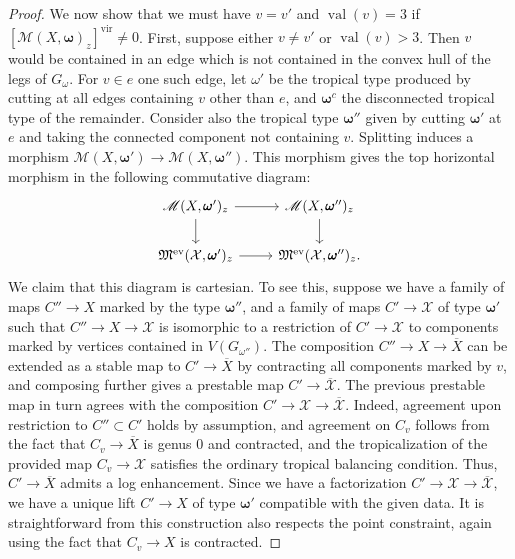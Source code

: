 \documentclass[12pt, oneside]{amsart}   	%
\newcommand{\val}{\operatorname{val}}
\newcommand{\vir}{\operatorname{vir}}
\newcommand{\ev}{\operatorname{ev}}
\numberwithin{equation}{section}
\numberwithin{thm}{section}
\numberwithin{figure}{section}
\begin{document}
\begin{proof}
We now show that we must have $v = v'$ and $\val(v) = 3$ if $[\mathscr{M}(X,\pmb\omega)_z]^{\vir} \not= 0$. First, suppose either $v \not= v'$ or $\val(v) > 3$. Then $v$ would be contained in an edge which is not contained in the convex hull of the legs of $G_\omega$. For $v \in e$ one such edge, let $\omega'$ be the tropical type produced by cutting at all edges containing $v$ other than $e$, and $\pmb\omega^c$ the disconnected tropical type of the remainder. Consider also the tropical type $\pmb\omega''$ given by cutting $\pmb\omega'$ at $e$ and taking the connected component not containing $v$. Splitting induces a morphism $\mathscr{M}(X,\pmb\omega') \rightarrow \mathscr{M}(X,\pmb\omega'')$. This morphism gives the top horizontal morphism in the following commutative diagram:
\begin{equation}\label{fgtdi}
\begin{tikzcd}
\mathscr{M}(X,\pmb\omega')_z\arrow{r}\arrow{d} & \mathscr{M}(X,\pmb\omega'')_z\arrow{d}\\
\mathfrak{M}^{\ev}(\mathcal{X},\pmb\omega')_z\arrow{r} & \mathfrak{M}^{\ev}(\mathcal{X},\pmb\omega'')_z.
\end{tikzcd}
\end{equation}
We claim that this diagram is cartesian. To see this, suppose we have a family of maps $C'' \rightarrow X$ marked by the type $\pmb\omega''$, and a family of maps $C' \rightarrow \mathcal{X}$ of type $\pmb\omega'$ such that $C'' \rightarrow X \rightarrow \mathcal{X}$ is isomorphic to a restriction of $C' \rightarrow \mathcal{X}$ to components marked by vertices contained in $V(G_{\omega''})$. The composition $C'' \rightarrow X \rightarrow \overline{X}$ can be extended as a stable map to $C' \rightarrow \overline{X}$ by contracting all components marked by $v$, and composing further gives a prestable map $C' \rightarrow \overline{\mathcal{X}}$. The previous prestable map in turn agrees with the composition $C' \rightarrow \mathcal{X}\rightarrow \overline{\mathcal{X}}$. Indeed, agreement upon restriction to $C'' \subset C'$ holds by assumption, and agreement on $C_v$ follows from the fact that $C_v \rightarrow \overline{X}$ is genus $0$ and contracted, and the tropicalization of the provided map $C_v \rightarrow \mathcal{X}$ satisfies the ordinary tropical balancing condition. Thus, $C' \rightarrow \overline{X}$ admits a log enhancement. Since we have a factorization $C' \rightarrow \mathcal{X} \rightarrow \overline{\mathcal{X}}$, we have a unique lift $C' \rightarrow X$ of type $\pmb\omega'$ compatible with the given data. It is straightforward from this construction also respects the point constraint, again using the fact that $C_v \rightarrow X$ is contracted. 


\end{proof}
\end{document}
